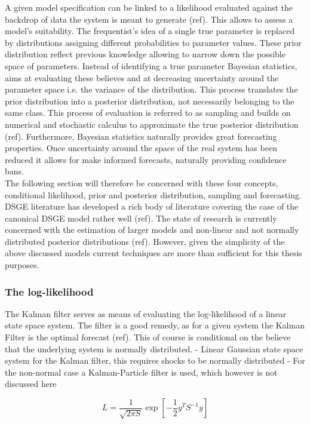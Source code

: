 \documentclass[11pt,a4paper,english]{article} %
\begin{document}
	A given model specification can be linked to a likelihood evaluated against the backdrop of data the system is meant to generate (ref). This allows to assess a model's suitability. The frequentist's idea of a single true parameter is replaced by distributions assigning different probabilities to parameter values. These prior distribution reflect previous knowledge allowing to narrow down the possible space of parameters. Instead of identifying a true parameter Bayesian statistics, aims at evaluating these believes and at decreasing uncertainty around the parameter space i.e. the variance of the distribution. This process translates the prior distribution into a posterior distribution, not necessarily belonging to the same class. 
	This process of evaluation is referred to as sampling and builds on numerical and stochastic calculus to approximate the true posterior distribution (ref). Furthermore, Bayesian statistics naturally provides great forecasting properties. Once uncertainty around the space of the real system has been reduced it allows for make informed forecasts, naturally providing confidence bans. \\
	
	The following section will therefore be concerned with these four concepts, conditional likelihood, prior and posterior distribution, sampling and forecasting. DSGE literature has developed a rich body of literature covering the case of the canonical DSGE model rather well (ref). The state of research is currently concerned with the estimation of larger models and non-linear and not normally distributed posterior distributions (ref). However, given the simplicity of the above discussed models current techniques are more than sufficient for this thesis purposes.
	
	
	\subsubsection{The log-likelihood}
	The Kalman filter serves as means of evaluating the log-likelihood of a linear state space system. The filter is a good remedy, as for a given system the Kalman Filter is the optimal forecast (ref). This of course is conditional on the believe that the underlying system is normally distributed.
	- Linear Gaussian state space system for the Kalman filter, this requires shocks to be normally distributed \cite{herbst_bayesian_2014}
	- For the non-normal case a Kalman-Particle filter is used, which however is not discussed here
	
	\[
	L = \frac{1}{\sqrt{2 \pi S}} \exp [- \frac{1}{2} y^T S^{-1} y]
	\]
\end{document}
